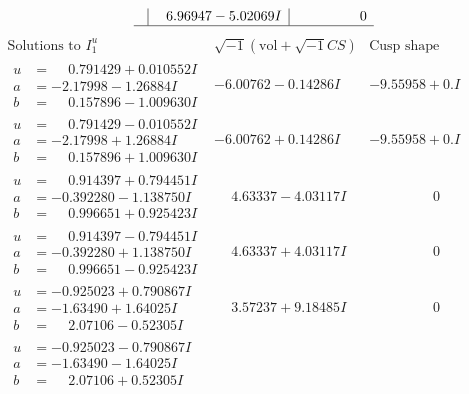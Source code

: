 \documentclass[1p]{elsarticle_modified}
\theoremstyle{definition}
\newcommand{\I}{\sqrt{-1}}
\begin{document}
$$\begin{array}{c|c|c}
 & \phantom{-}6.96947 - 5.02069 I & \phantom{-0.000000 } 0\\
 \hline 
 \end{array}$$\newpage$$\begin{array}{c|c|c}  
\text{Solutions to }I^u_{1}& \I (\text{vol} + \sqrt{-1}CS) & \text{Cusp shape}\\
 \hline 
\begin{aligned}
u &= \phantom{-}0.791429 + 0.010552 I \\
a &= -2.17998 - 1.26884 I \\
b &= \phantom{-}0.157896 - 1.009630 I\end{aligned}
 & -6.00762 - 0.14286 I & -9.55958 + 0. I\phantom{ +0.000000I} \\ \hline\begin{aligned}
u &= \phantom{-}0.791429 - 0.010552 I \\
a &= -2.17998 + 1.26884 I \\
b &= \phantom{-}0.157896 + 1.009630 I\end{aligned}
 & -6.00762 + 0.14286 I & -9.55958 + 0. I\phantom{ +0.000000I} \\ \hline\begin{aligned}
u &= \phantom{-}0.914397 + 0.794451 I \\
a &= -0.392280 - 1.138750 I \\
b &= \phantom{-}0.996651 + 0.925423 I\end{aligned}
 & \phantom{-}4.63337 - 4.03117 I & \phantom{-0.000000 } 0 \\ \hline\begin{aligned}
u &= \phantom{-}0.914397 - 0.794451 I \\
a &= -0.392280 + 1.138750 I \\
b &= \phantom{-}0.996651 - 0.925423 I\end{aligned}
 & \phantom{-}4.63337 + 4.03117 I & \phantom{-0.000000 } 0 \\ \hline\begin{aligned}
u &= -0.925023 + 0.790867 I \\
a &= -1.63490 + 1.64025 I \\
b &= \phantom{-}2.07106 - 0.52305 I\end{aligned}
 & \phantom{-}3.57237 + 9.18485 I & \phantom{-0.000000 } 0 \\ \hline\begin{aligned}
u &= -0.925023 - 0.790867 I \\
a &= -1.63490 - 1.64025 I \\
b &= \phantom{-}2.07106 + 0.52305 I\end{aligned}

\end{array}$$
\end{document}
